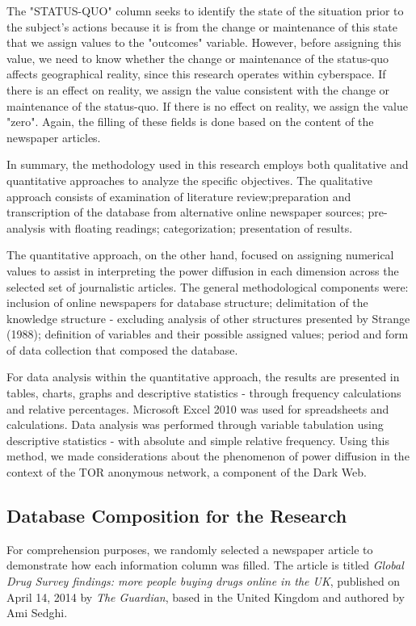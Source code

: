 The "STATUS-QUO" column seeks to identify the state of the situation prior to the subject's actions because it is from the change or maintenance of this state that we assign values to the "outcomes" variable. However, before assigning this value, we need to know whether the change or maintenance of the status-quo affects geographical reality, since this research operates within cyberspace. If there is an effect on reality, we assign the value consistent with the change or maintenance of the status-quo. If there is no effect on reality, we assign the value "zero". Again, the filling of these fields is done based on the content of the newspaper articles.

In summary, the methodology used in this research employs both qualitative and quantitative approaches to analyze the specific objectives. The qualitative approach consists of examination of literature review;preparation and transcription of the database from alternative online newspaper sources; pre-analysis with floating readings; categorization; presentation of results.

The quantitative approach, on the other hand, focused on assigning numerical values to assist in interpreting the power diffusion in each dimension across the selected set of journalistic articles. The general methodological components were: inclusion of online newspapers for database structure; delimitation of the knowledge structure - excluding analysis of other structures presented by Strange (1988); definition of variables and their possible assigned values; period and form of data collection that composed the database.

For data analysis within the quantitative approach, the results are presented in tables, charts, graphs and descriptive statistics - through frequency calculations and relative percentages. Microsoft Excel 2010 was used for spreadsheets and calculations. Data analysis was performed through variable tabulation using descriptive statistics - with absolute and simple relative frequency. Using this method, we made considerations about the phenomenon of power diffusion in the context of the TOR anonymous network, a component of the Dark Web.

\subsection{Database Composition for the Research}
\label{subsec:database_composition}

For comprehension purposes, we randomly selected a newspaper article to demonstrate how each information column was filled. The article is titled \textit{Global Drug Survey findings: more people buying drugs online in the UK}, published on April 14, 2014 by \textit{The Guardian}, based in the United Kingdom and authored by Ami Sedghi.

